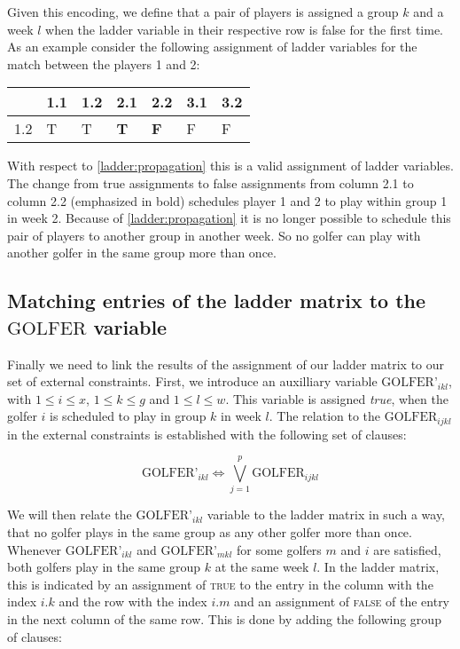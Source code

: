 \documentclass[a4paper]{scrartcl}
\begin{document}
Given this encoding, we define that a pair of players is assigned a group $k$ and a week $l$ when the ladder variable in their respective row is false for the first time. As an example consider the following assignment of ladder variables for the match between the players 1 and 2:

\begin{table}[h]
\centering
\begin{tabular}{ l | l | l | l | l | l | l }
    & 1.1 & 1.2 & 2.1 & 2.2 & 3.1 & 3.2 \\
\hline
1.2 & T & T & \textbf{T} & \textbf{F} & F & F \\
\end{tabular}
\end{table}

With respect to \ref{ladder:propagation} this is a valid assignment of ladder variables. The change from true assignments to false assignments from column 2.1 to column 2.2 (emphasized in bold) schedules player 1 and 2 to play within group 1 in week 2. Because of \ref{ladder:propagation} it is no longer possible to schedule this pair of players to another group in another week. So no golfer can play with another golfer in the same group more than once.


\subsection{Matching entries of the ladder matrix to the $\text{GOLFER}$ variable}

Finally we need to link the results of the assignment of our ladder matrix to our set of external constraints. First, we introduce an auxilliary variable $\text{GOLFER'}_{ikl}$, with $1 \leq i \leq x$, $1 \leq k \leq g$ and $1 \leq l \leq w$. This variable is assigned \emph{true}, when the golfer $i$ is scheduled to play in group $k$ in week $l$. The relation to the $\text{GOLFER}_{ijkl}$ in the external constraints is established with the following set of clauses:

\begin{equation}
    \text{GOLFER'}_{ikl} \iff \bigvee \limits_{j=1}^p \text{GOLFER}_{ijkl}
\end{equation}

We will then relate the $\text{GOLFER'}_{ikl}$ variable to the ladder matrix in such a way, that no golfer plays in the same group as any other golfer more than once. Whenever $\text{GOLFER'}_{ikl}$ and $\text{GOLFER'}_{mkl}$ for some golfers $m$ and $i$ are satisfied, both golfers play in the same group $k$ at the same week $l$. In the ladder matrix, this is indicated by an assignment of \textsc{true} to the entry in the column with the index $i.k$ and the row with the index $i.m$ and an assignment of \textsc{false} of the entry in the next column of the same row. This is done by adding the following group of clauses:
\end{document}
